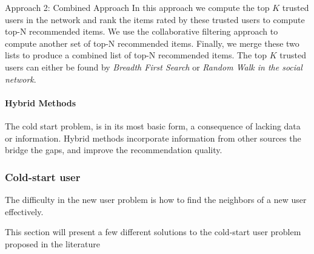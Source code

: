 Approach 2: Combined Approach
In this approach we compute the top $K$ trusted users in the network and rank the items rated by these trusted users to compute top-N recommended items. We use the collaborative filtering approach to compute another set of top-N recommended items. Finally, we merge these two lists to produce a combined list of top-N recommended items. The top $K$ trusted users can either be found by \emph{Breadth First Search} or \emph{Random Walk in the social network}.


\paragraph{Hybrid Methods}

The cold start problem, is in its most basic form, a consequence of lacking data or information. Hybrid methods incorporate information from other sources the bridge the gaps, and improve the recommendation quality.

\subsubsection{Cold-start user}


The difficulty in the new user problem is how to find the neighbors of a new user effectively.

This section will present a few different solutions to the cold-start user problem proposed in the literature


